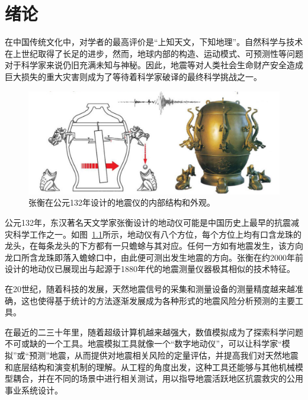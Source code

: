 \documentclass[degree=doctor]{thuthesis}
\begin{document}
\frontmatter

\tableofcontents




\mainmatter

\chapter{绪论}

在中国传统文化中，对学者的最高评价是“上知天文，下知地理”。自然科学与技术在上世纪取得了长足的进步，然而，地球内部的构造、运动模式、可预测性等问题对于科学家来说仍旧充满未知与神秘。因此，地震等对人类社会生命财产安全造成巨大损失的重大灾害则成为了等待着科学家破译的最终科学挑战之一\citep{anderson1989theory}。

\begin{figure}[t]
\centering
\includegraphics[width=0.7\columnwidth]{seismoscope.png}
\caption{张衡在公元132年设计的地震仪的内部结构和外观\citep{hsiao2009review}。}
\label{fig:heng-scope}
\end{figure}

公元132年，东汉著名天文学家张衡设计的地动仪可能是中国历史上最早的抗震减灾科学工作之一\citep{stein2009introduction}。如图~\ref{fig:heng-scope}所示，地动仪有八个方位，每个方位上均有口含龙珠的龙头，在每条龙头的下方都有一只蟾蜍与其对应。任何一方如有地震发生，该方向龙口所含龙珠即落入蟾蜍口中，由此便可测出发生地震的方向\cite{seismoscopewiki}。张衡在约2000年前设计的地动仪已展现出与起源于1880年代的地震测量仪器极其相似的技术特征。

在20世纪，随着科技的发展，天然地震信号的采集和测量设备的测量精度越来越准确，这也使得基于统计的方法逐渐发展成为各种形式的地震风险分析预测的主要工具。

在最近的二三十年里，随着超级计算机越来越强大，数值模拟成为了探索科学问题不可或缺的一个工具。地震模拟工具就像一个“数字地动仪”，可以让科学家“模拟”或“预测”地震，从而提供对地震相关风险的定量评估，并提高我们对天然地震和底层结构和演变机制的理解。从工程的角度出发，这种工具还能够与其他机械模型耦合，并在不同的场景中进行相关测试，用以指导地震活跃地区抗震救灾的公用事业系统设计。
\end{document}
